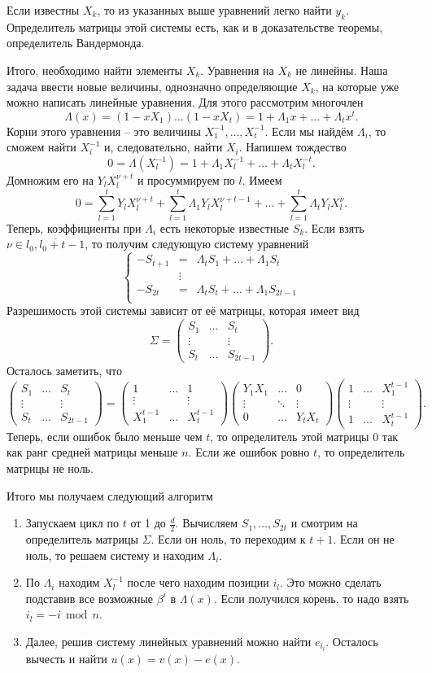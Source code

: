 \documentclass[10pt,a4paper,oneside]{book}
\theoremstyle{definition}
\renewcommand{\mod}{\,\operatorname{mod}\,}
\newcommand{\ovl}{\overline}
\def\enm{\begin{enumerate}}
\def\eenm{\end{enumerate}}
\def\pmat{\begin{pmatrix}}
\def\epmat{\end{pmatrix}}
\begin{document}
Если известны $X_k$, то из указанных выше уравнений легко найти $y_k$. Определитель матрицы этой системы есть, как и в доказательстве теоремы, определитель Вандермонда.

Итого, необходимо найти элементы $X_k$. Уравнения на $X_k$ не линейны. Наша задача ввести новые величины, однозначно определяющие $X_k$, на которые уже можно написать линейные уравнения. Для этого рассмотрим многочлен 
$$\Lambda(x)=(1-xX_1)\dots(1-xX_t)= 1+\Lambda_1x+\dots+\Lambda_tx^t.$$
Корни этого уравнения -- это величины $X_1^{-1},\dots,X_t^{-1}$. Если мы найдём $\Lambda_i$, то сможем найти $X_i^{-1}$ и, следовательно, найти $X_i$. Напишем тождество
$$0=\Lambda(X_l^{-1})=1+\Lambda_1 X_l^{-1}+\dots+\Lambda_t X_l^{-t}.$$
Домножим его на $Y_lX_l^{\nu+t}$ и просуммируем по $l$. Имеем
$$ 0=\sum_{l=1}^t Y_lX_l^{\nu+t}+\sum_{l=1}^t\Lambda_1 Y_lX_l^{\nu+t-1}+\dots+\sum_{l=1}^t\Lambda_t Y_lX_l^{\nu}.$$
Теперь, коэффициенты при $\Lambda_i$ есть некоторые известные $S_k$. Если взять $\nu \in \ovl{l_0,l_0+t-1}$, то получим следующую систему уравнений
$$\left\{ \begin{array}{rcl}
-S_{t+1}&=& \Lambda_t S_{1}+\dots + \Lambda_1 S_{t}\\
&\vdots&\\
-S_{2t}&=& \Lambda_t S_{t}+\dots + \Lambda_1 S_{2t-1}\\
\end{array} \right.$$
Разрешимость этой системы зависит от её матрицы, которая имеет вид 
$$ \Sigma =\pmat
S_1 & \dots & S_t\\
\vdots & & \vdots\\
S_t & \dots & S_{2t-1}
\epmat.
$$
Осталось заметить, что 
$$ \pmat
S_1 & \dots & S_t\\
\vdots & & \vdots\\
S_t & \dots & S_{2t-1}
\epmat =  \pmat
1 & \dots & 1\\
\vdots & & \vdots\\
X_1^{t-1} & \dots & X_t^{t-1}
\epmat
\pmat
Y_1X_1 & \dots & 0\\
\vdots & \ddots& \vdots\\
0 & \dots & Y_tX_t
\epmat
\pmat
1& \dots & X_1^{t-1}\\
\vdots & & \vdots\\
1 & \dots & X_t^{t-1}
\epmat .
$$
Теперь, если ошибок было меньше чем $t$, то определитель этой матрицы 0 так как ранг средней матрицы меньше $n$. Если же ошибок ровно $t$, то определитель матрицы не ноль.

Итого мы получаем следующий алгоритм
\enm 
\item Запускаем цикл по $t$ от 1 до $\frac{d}{2}$. Вычисляем $S_1,\dots,S_{2t}$ и смотрим на определитель матрицы $\Sigma$. Если он ноль, то переходим к $t+1$. Если он не ноль, то решаем систему и находим $\Lambda_i$.
\item По $\Lambda_i$ находим $X_l^{-1}$ после чего находим позиции $i_l$. Это можно сделать подставив все возможные $\beta^i$ в $\Lambda(x)$. Если получился корень, то надо взять $i_l=-i \mod n$.  
\item Далее, решив систему линейных уравнений можно найти $e_{i_l}$. Осталось вычесть и найти $u(x)=v(x)-e(x)$.
\eenm
\end{document}

